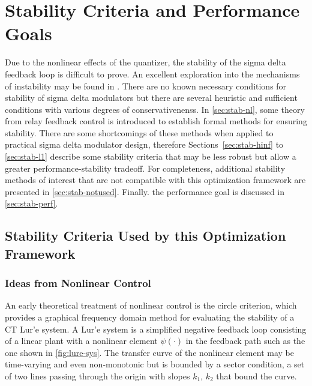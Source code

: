 
\chapter{Stability Criteria and Performance Goals}
\label{ch:Stability}

Due to the nonlinear effects of the quantizer, the stability of the sigma delta feedback loop is difficult to prove. An excellent exploration into the mechanisms of instability may be found in \cite{Risbo1994}. There are no known necessary conditions for stability of sigma delta modulators but there are several heuristic and sufficient conditions with various degrees of conservativenenss. In \autoref{sec:stab-nl}, some theory from relay feedback control is introduced to establish formal methods for ensuring stability. There are some shortcomings of these methods when applied to practical sigma delta modulator design, therefore Sections~\ref{sec:stab-hinf} to \ref{sec:stab-l1} describe some stability criteria that may be less robust but allow a greater performance-stability tradeoff. For completeness, additional stability methods of interest that are not compatible with this optimization framework are presented in \autoref{sec:stab-notused}. Finally. the performance goal is discussed in \autoref{sec:stab-perf}.

\section{Stability Criteria Used by this Optimization Framework}
\label{sec:stab-used}

\subsection{Ideas from Nonlinear Control}
\label{sec:stab-nl}

An early theoretical treatment of nonlinear control is the circle criterion, which provides a graphical frequency domain method for evaluating the stability of a \gls{CT} Lur'e system. A Lur'e system is a simplified negative feedback loop consisting of a linear plant with a nonlinear element $\psi(\cdot)$ in the feedback path such as the one shown in \autoref{fig:lure-sys}. The transfer curve of the nonlinear element may be time-varying and even non-monotonic but is bounded by a sector condition, a set of two lines passing through the origin with slopes $k_1$, $k_2$ that bound the curve.

